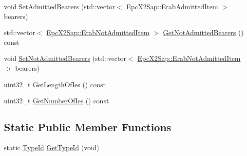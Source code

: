 \begin{DoxyCompactItemize}
void \hyperlink{classns3_1_1EpcX2HandoverRequestAckHeader_ae38678e22d0db375691a061e6a22f21a}{Set\+Admitted\+Bearers} (std\+::vector$<$ \hyperlink{structns3_1_1EpcX2Sap_1_1ErabAdmittedItem}{Epc\+X2\+Sap\+::\+Erab\+Admitted\+Item} $>$ bearers)
\item 
std\+::vector$<$ \hyperlink{structns3_1_1EpcX2Sap_1_1ErabNotAdmittedItem}{Epc\+X2\+Sap\+::\+Erab\+Not\+Admitted\+Item} $>$ \hyperlink{classns3_1_1EpcX2HandoverRequestAckHeader_a605ebe352f0f4bc2629fde4f7d1fca76}{Get\+Not\+Admitted\+Bearers} () const 
\item 
void \hyperlink{classns3_1_1EpcX2HandoverRequestAckHeader_a99b98d2ad1ac59ee868c118581b7b656}{Set\+Not\+Admitted\+Bearers} (std\+::vector$<$ \hyperlink{structns3_1_1EpcX2Sap_1_1ErabNotAdmittedItem}{Epc\+X2\+Sap\+::\+Erab\+Not\+Admitted\+Item} $>$ bearers)
\item 
uint32\+\_\+t \hyperlink{classns3_1_1EpcX2HandoverRequestAckHeader_a2ebad3d019f61570ffefd353e0e2a960}{Get\+Length\+Of\+Ies} () const 
\item 
uint32\+\_\+t \hyperlink{classns3_1_1EpcX2HandoverRequestAckHeader_a2226deccf135e4907b31b86c9d7ed4a3}{Get\+Number\+Of\+Ies} () const 
\end{DoxyCompactItemize}
\subsection*{Static Public Member Functions}
\begin{DoxyCompactItemize}
\item 
static \hyperlink{classns3_1_1TypeId}{Type\+Id} \hyperlink{classns3_1_1EpcX2HandoverRequestAckHeader_abd968fe8bd6ffaa6e7743c3d5f75b3bb}{Get\+Type\+Id} (void)
\end{DoxyCompactItemize}
